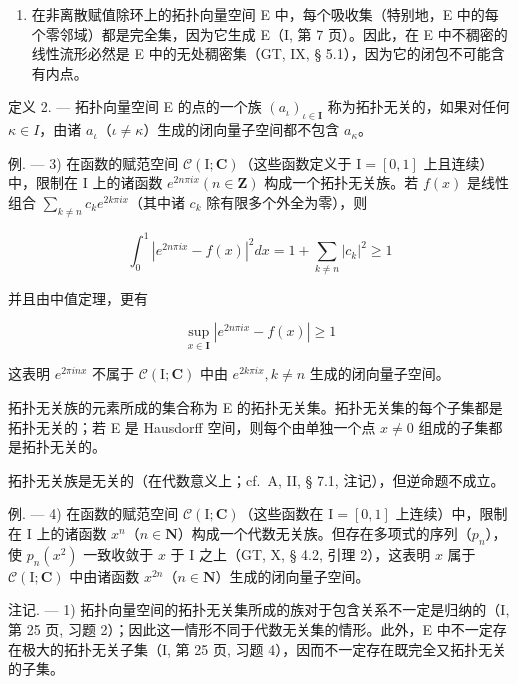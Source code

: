\begin{enumerate}
\def\labelenumi{\arabic{enumi})}
\setcounter{enumi}{1}
\tightlist
\item
  在非离散赋值除环上的拓扑向量空间 E 中，每个吸收集（特别地，E 中的每个零邻域）都是完全集，因为它生成 E（I, 第 7 页）。因此，在 E 中不稠密的线性流形必然是 E 中的无处稠密集（GT, IX, § 5.1），因为它的闭包不可能含有内点。
\end{enumerate}

定义 2. --- 拓扑向量空间 E 的点的一个族 \((a_{\iota})_{\iota\in\mathbf{I}}\) 称为拓扑无关的，如果对任何 \(\kappa\in I\)，由诸 \(a_{\iota}\)（\(\iota\neq\kappa\)）生成的闭向量子空间都不包含 \(a_{\kappa}\)。

例. --- 3) 在函数的赋范空间 \(\mathcal{C}(\mathrm{I};\mathbf{C})\)（这些函数定义于 \(\mathrm{I} = [0,1]\) 上且连续）中，限制在 \(\mathrm{I}\) 上的诸函数 \(e^{2n\pi ix}(n\in \mathbf{Z})\) 构成一个拓扑无关族。若 \(f(x)\) 是线性组合 \(\sum_{k\neq n}c_k e^{2k\pi ix}\)（其中诸 \(c_k\) 除有限多个外全为零），则

\[
\int_ {0} ^ {1} \left| e ^ {2 n \pi i x} - f (x) \right| ^ {2} d x = 1 + \sum_ {k \neq n} | c _ {k} | ^ {2} \geqslant 1
\]

并且由中值定理，更有

\[
\sup _ {x \in \mathbf {I}} \left| e ^ {2 n \pi i x} - f (x) \right| \geqslant 1
\]

这表明 \(e^{2\pi inx}\) 不属于 \(\mathcal{C}(\mathrm{I};\mathbf{C})\) 中由 \(e^{2k\pi ix}, k \neq n\) 生成的闭向量子空间。

拓扑无关族的元素所成的集合称为 E 的拓扑无关集。拓扑无关集的每个子集都是拓扑无关的；若 E 是 Hausdorff 空间，则每个由单独一个点 \(x \neq 0\) 组成的子集都是拓扑无关的。

拓扑无关族是无关的（在代数意义上；cf.~A, II, § 7.1, 注记），但逆命题不成立。

例. --- 4) 在函数的赋范空间 \(\mathcal{C}(\mathrm{I};\mathbf{C})\)（这些函数在 \(\mathrm{I} = [0,1]\) 上连续）中，限制在 \(\mathrm{I}\) 上的诸函数 \(x^n\)（\(n\in \mathbf{N}\)）构成一个代数无关族。但存在多项式的序列（\(p_n\)），使 \(p_n(x^2)\) 一致收敛于 \(x\) 于 \(\mathrm{I}\) 之上（GT, X, § 4.2, 引理 2），这表明 \(x\) 属于 \(\mathcal{C}(\mathrm{I};\mathbf{C})\) 中由诸函数 \(x^{2n}\)（\(n\in \mathbf{N}\)）生成的闭向量子空间。

注记. --- 1) 拓扑向量空间的拓扑无关集所成的族对于包含关系不一定是归纳的（I, 第 25 页, 习题 2）；因此这一情形不同于代数无关集的情形。此外，E 中不一定存在极大的拓扑无关子集（I, 第 25 页, 习题 4），因而不一定存在既完全又拓扑无关的子集。

